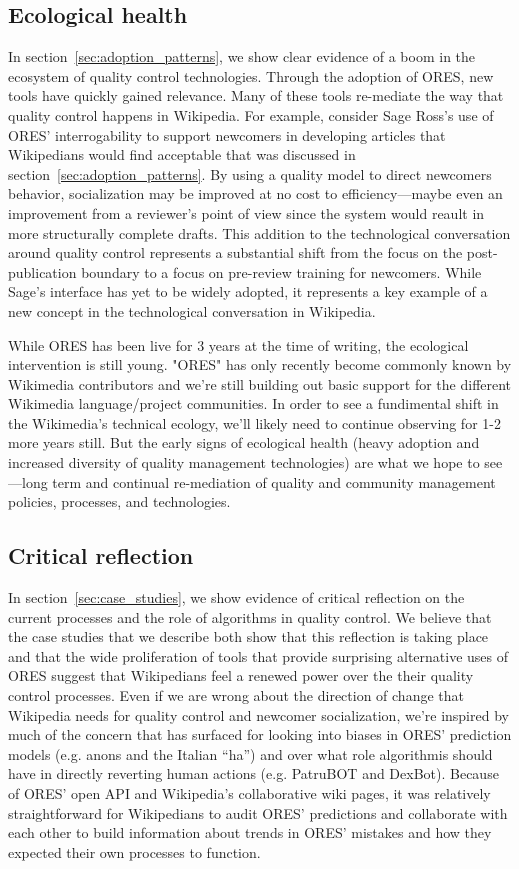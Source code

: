 \subsection{Ecological health}
In section~\ref{sec:adoption_patterns}, we show clear evidence of a boom in the ecosystem of quality control technologies.  Through the adoption of ORES, new tools have quickly gained relevance.  Many of these tools re-mediate the way that quality control happens in Wikipedia.  For example, consider Sage Ross's use of ORES' interrogability to support newcomers in developing articles that Wikipedians would find acceptable that was discussed in section~\ref{sec:adoption_patterns}.  By using a quality model to direct newcomers behavior, socialization may be improved at no cost to efficiency---maybe even an improvement from a reviewer's point of view since the system would reault in more structurally complete drafts.  This addition to the technological conversation around quality control represents a substantial shift from the focus on the post-publication boundary\cite{geiger2012defense} to a focus on pre-review training for newcomers.  While Sage's interface has yet to be widely adopted, it represents a key example of a new concept in the technological conversation in Wikipedia.

While ORES has been live for 3 years at the time of writing, the ecological intervention is still young.  "ORES" has only recently become commonly known by Wikimedia contributors and we're still building out basic support for the different Wikimedia language/project communities.  In order to see a fundimental shift in the Wikimedia's technical ecology, we'll likely need to continue observing for 1-2 more years still.  But the early signs of ecological health (heavy adoption and increased diversity of quality management technologies) are what we hope to see---long term and continual re-mediation of quality and community management policies, processes, and technologies. 

\subsection{Critical reflection}
In section~\ref{sec:case_studies}, we show evidence of critical reflection on the current processes and the role of algorithms in quality control.  We believe that the case studies that we describe both show that this reflection is taking place and that the wide proliferation of tools that provide surprising alternative uses of ORES suggest that Wikipedians feel a renewed power over the their quality control processes.  Even if we are wrong about the direction of change that Wikipedia needs for quality control and newcomer socialization, we're inspired by much of the concern that has surfaced for looking into biases in ORES' prediction models (e.g. anons and the Italian ``ha'') and over what role algorithmis should have in directly reverting human actions (e.g. PatruBOT and DexBot).  Because of ORES' open API and Wikipedia's collaborative wiki pages, it was relatively straightforward for Wikipedians to audit ORES' predictions and collaborate with each other to build information about trends in ORES' mistakes and how they expected their own processes to function.

